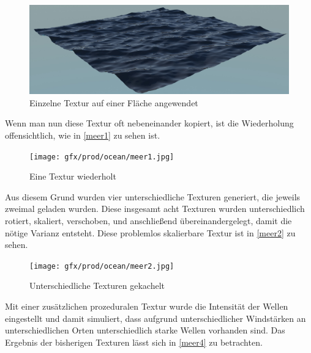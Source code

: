 \begin{figure}[H]
\includegraphics[width=\textwidth]{gfx/prod/ocean/meer0.jpg}
\caption{Einzelne Textur auf einer Fläche angewendet}
\label{meer0}
\end{figure}
\noindent
Wenn man nun diese Textur oft nebeneinander kopiert, ist die Wiederholung offensichtlich, wie in \autoref{meer1} zu sehen ist.
%
\begin{figure}[H]
\texttt{[image: gfx/prod/ocean/meer1.jpg]}
\caption{Eine Textur wiederholt}
\label{meer1}
\end{figure}
\noindent
Aus diesem Grund wurden vier unterschiedliche Texturen generiert, die jeweils zweimal geladen wurden. Diese insgesamt acht Texturen wurden unterschiedlich rotiert, skaliert, verschoben, und anschließend übereinandergelegt, damit die nötige Varianz entsteht. Diese problemlos skalierbare Textur ist in \autoref{meer2} zu sehen.
%
\begin{figure}[H]
\texttt{[image: gfx/prod/ocean/meer2.jpg]}
\caption{Unterschiedliche Texturen gekachelt}
\label{meer2}
\end{figure}
\noindent
Mit einer zusätzlichen prozeduralen Textur wurde die Intensität der Wellen eingestellt und damit simuliert, dass aufgrund unterschiedlicher Windstärken an unterschiedlichen Orten unterschiedlich starke Wellen vorhanden sind. Das Ergebnis der bisherigen Texturen lässt sich in \autoref{meer4} zu betrachten.


